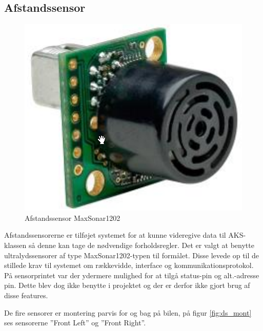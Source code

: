 \subsection{Afstandssensor}
\begin{figure}[h]
	\centering
	\includegraphics[scale=0.4]{../fig/billeder/distancesensor.png}
	\caption{Afstandssensor MaxSonar1202}
	\label{fig:ds_pic}
\end{figure}

Afstandssensorerne er tilføjet systemet for at kunne videregive data til AKS-klassen så denne kan tage de nødvendige forholdsregler. 
Det er valgt at benytte ultralydssensorer af type MaxSonar1202-typen \cite{lib:maxsonar} til formålet. 
Disse levede op til de stillede krav til systemet om rækkevidde, interface og kommunikationsprotokol.
På sensorprintet var der ydermere mulighed for at tilgå status-pin og alt.-adresse pin. Dette blev dog ikke benytte i projektet og der er derfor ikke gjort brug af disse features.

De fire sensorer er montering parvis for og bag på bilen, på figur \ref{fig:ds_mont} ses sensorerne ''Front Left'' og ''Front Right''. 

